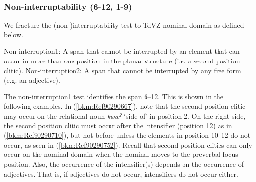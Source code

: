 \documentclass[output=paper]{langscibook}
\begin{document}
\subsubsection{Non-interruptability (6-12, 1-9)}

We fracture the (non-)interruptability test to TdVZ nominal domain as defined below.

\ea 
Non-interruption1: A span that cannot be interrupted by an element that can occur in more than one position in the planar structure (i.e. a second position clitic).
\ex
Non-interruption2: A span that cannot be interrupted by any free form (e.g. an adjective).
\z

The non-interruption1 test identifies the span 6--12. This is shown in the following examples. In (\ref{bkm:Ref90290667}), note that the second position clitic may occur on the relational noun \textit{kwæˀ} `side of' in position 2. On the right side, the second position clitic must occur after the intensifier (position 12) as in (\ref{bkm:Ref90290710}), but not before unless the elements in position 10--12 do not occur, as seen in (\ref{bkm:Ref90290752}). Recall that second position clitics can only occur on the nominal domain when the nominal moves to the preverbal focus position. Also, the occurrence of the intensifier(s) depends on the occurrence of adjectives. That is, if adjectives do not occur, intensifiers do not occur either.
\end{document}
